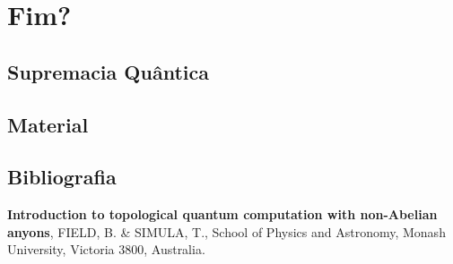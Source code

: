 \documentclass[t]{beamer}
\begin{document}
	\section{Fim?}

	\subsection{Supremacia Quântica}
	
	\begin{frame}
	
	\end{frame}	
	
	\begin{frame}{\subsecname}
	
	\end{frame}
	
	\subsection{Material}
	
	\begin{frame}{\subsecname}
	
	\end{frame}
	
	\subsection{Bibliografia}
	
	\begin{frame}{\subsecname}
		
		 \textbf{Introduction to topological quantum computation with non-Abelian anyons}, FIELD, B. \& SIMULA, T., School of Physics and Astronomy, Monash University, Victoria 3800, Australia.
		
		\bibitem{}
	\end{frame}
\end{document}
